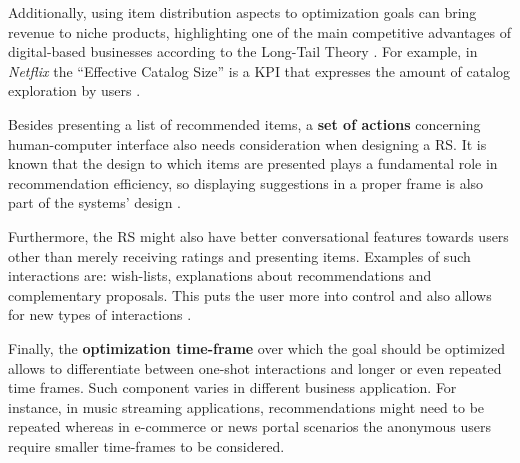 
    Additionally, using item distribution aspects to optimization goals can bring revenue to niche products, highlighting one of the main competitive advantages of digital-based businesses according to the Long-Tail Theory \cite{2006LongTail}. For example, in \textit{Netflix} the ``Effective Catalog Size'' is a KPI that expresses the amount of catalog exploration by users \cite{2016NetflixBusinessValue}.


    Besides presenting a list of recommended items, a \textbf{set of actions} concerning human-computer interface also needs consideration when designing a RS. It is known that the design to which items are presented plays a fundamental role in recommendation efficiency, so displaying suggestions in a proper frame is also part of the systems' design \cite{2012UserExperience}.
    
    Furthermore, the RS might also have better conversational features towards users other than merely receiving ratings and presenting items. Examples of such interactions are: wish-lists, explanations about recommendations and complementary proposals. This puts the user more into control and also   allows for new types of interactions \cite{2016BeyondMatrixCompletion}.  

    Finally, the \textbf{optimization time-frame} over which the goal should be optimized allows to differentiate between one-shot interactions and longer or even repeated time frames. Such component varies in different business application. For instance, in music streaming applications, recommendations might need to be repeated whereas in e-commerce or news portal scenarios the anonymous users require smaller time-frames to be considered. 

